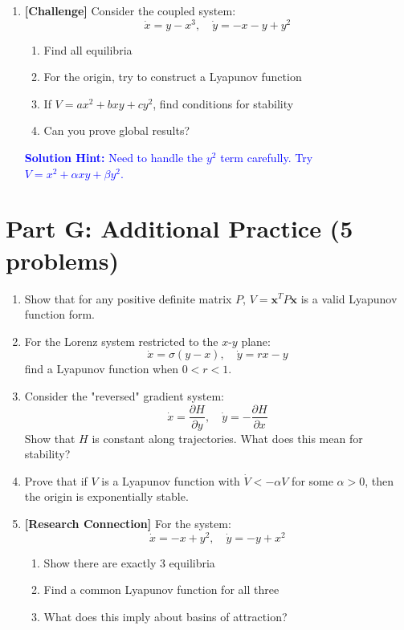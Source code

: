 \documentclass[12pt]{article}
\newcommand{\solution}[1]{\textcolor{blue}{\textbf{Solution Hint:} #1}}
\begin{document}
\begin{enumerate}[resume]
\item \textbf{[Challenge]} Consider the coupled system:
$$\dot{x} = y - x^3, \quad \dot{y} = -x - y + y^2$$
\begin{enumerate}[label=(\alph*)]
    \item Find all equilibria
    \item For the origin, try to construct a Lyapunov function
    \item If $V = ax^2 + bxy + cy^2$, find conditions for stability
    \item Can you prove global results?
\end{enumerate}
\solution{Need to handle the $y^2$ term carefully. Try $V = x^2 + \alpha xy + \beta y^2$.}
\end{enumerate}

\section*{Part G: Additional Practice (5 problems)}

\begin{enumerate}[resume]
\item Show that for any positive definite matrix $P$, $V = \mathbf{x}^T P \mathbf{x}$ is a valid Lyapunov function form.

\item For the Lorenz system restricted to the $x$-$y$ plane:
$$\dot{x} = \sigma(y-x), \quad \dot{y} = rx - y$$
find a Lyapunov function when $0 < r < 1$.

\item Consider the "reversed" gradient system:
$$\dot{x} = \frac{\partial H}{\partial y}, \quad \dot{y} = -\frac{\partial H}{\partial x}$$
Show that $H$ is constant along trajectories. What does this mean for stability?

\item Prove that if $V$ is a Lyapunov function with $\dot{V} < -\alpha V$ for some $\alpha > 0$, then the origin is exponentially stable.

\item \textbf{[Research Connection]} For the system:
$$\dot{x} = -x + y^2, \quad \dot{y} = -y + x^2$$
\begin{enumerate}[label=(\alph*)]
    \item Show there are exactly 3 equilibria
    \item Find a common Lyapunov function for all three
    \item What does this imply about basins of attraction?
\end{enumerate}
\end{enumerate}
\end{document}
